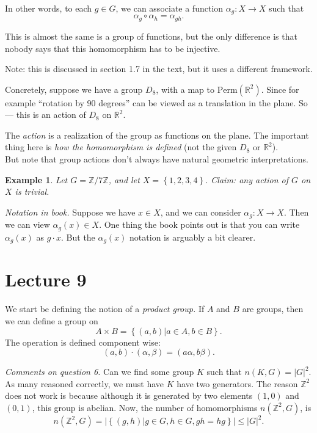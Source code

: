 \documentclass[12pt]{article}
\newtheorem*{example}{Example}
\newcommand{\RR}{\mathbb{R}}
\def\ZZ{\mathbb{Z}}
\begin{document}
  In other words, to each $g \in G$, we can associate a function $\alpha_g : X \to X$ such that
  \[
    \alpha_g \circ \alpha_h = \alpha_{gh}.
  \]

  This is almost the same is a group of functions, but the only difference is that nobody says that this homomorphism has to be injective.

  Note: this is discussed in section 1.7 in the text, but it uses a different framework.

  Concretely, suppose we have a group $D_8$, with a map to $\text{Perm}(\RR^2)$.  Since for example ``rotation by 90 degrees'' can be viewed as a translation in the plane.  So --- this is an action of $D_8$ on $\RR^2$.

  The {\it action} is a realization of the group as functions on the plane.  The important thing here is {\it how the homomorphism is defined} (not the given $D_8$ or $\RR^2$). \\

  But note that group actions don't always have natural geometric interpretations.
  \begin{example}
    Let $G = \ZZ / 7 \ZZ$, and let $X = \left\{ 1, 2, 3, 4 \right\}$.  Claim: any action of $G$ on $X$ is trivial.
  \end{example}

  {\it Notation in book.} Suppose we have $x \in X$, and we can consider $\alpha_g : X \to X$.  Then we can view $\alpha_g(x) \in X$.  One thing the book points out is that you can write $\alpha_g(x)$ as $g \cdot x$.  But the $\alpha_g(x)$ notation is arguably a bit clearer.


  \section{Lecture 9}

  We start be defining the notion of a {\it product group.}  If $A$ and $B$ are groups, then we can define a group on
  \[
    A \times B = \left\{ (a, b) | a\in A, b \in B \right\}.
  \]
  The operation is defined component wise:
  \[
    (a, b) \cdot (\alpha, \beta) = (a \alpha, b \beta).
  \]

  {\it Comments on question 6.}  Can we find some group $K$ such that $n(K, G) = |G|^2$.  As many reasoned correctly, we must have $K$ have two generators.  The reason $\ZZ^2$ does not work is because although it is generated by two elements $(1, 0)$ and $(0, 1)$, this group is abelian.  Now, the number of homomorphisms $n(\ZZ^2, G)$, is
  \[
    n(\ZZ^2, G) = |\left\{ (g, h) | g\in G, h \in G, gh = hg \right\}| \leq |G|^2.
  \]
\end{document}

